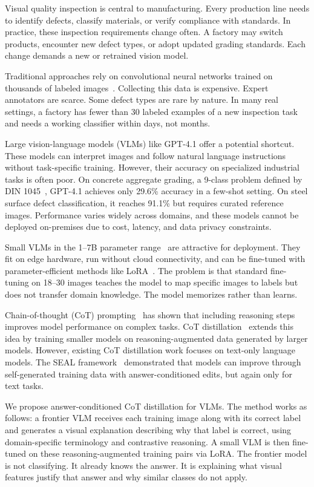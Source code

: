 \documentclass{bmvc2k}
\begin{document}
Visual quality inspection is central to manufacturing. Every production line needs to identify defects, classify materials, or verify compliance with standards. In practice, these inspection requirements change often. A factory may switch products, encounter new defect types, or adopt updated grading standards. Each change demands a new or retrained vision model.

Traditional approaches rely on convolutional neural networks trained on thousands of labeled images~\cite{czimmermann2020visual}. Collecting this data is expensive. Expert annotators are scarce. Some defect types are rare by nature. In many real settings, a factory has fewer than 30 labeled examples of a new inspection task and needs a working classifier within days, not months.

Large vision-language models (VLMs) like GPT-4.1 offer a potential shortcut. These models can interpret images and follow natural language instructions without task-specific training. However, their accuracy on specialized industrial tasks is often poor. On concrete aggregate grading, a 9-class problem defined by DIN 1045~\cite{din1045}, GPT-4.1 achieves only 29.6\% accuracy in a few-shot setting. On steel surface defect classification, it reaches 91.1\% but requires curated reference images. Performance varies widely across domains, and these models cannot be deployed on-premises due to cost, latency, and data privacy constraints.

Small VLMs in the 1--7B parameter range~\cite{wang2024qwen2vl} are attractive for deployment. They fit on edge hardware, run without cloud connectivity, and can be fine-tuned with parameter-efficient methods like LoRA~\cite{hu2021lora}. The problem is that standard fine-tuning on 18--30 images teaches the model to map specific images to labels but does not transfer domain knowledge. The model memorizes rather than learns.

Chain-of-thought (CoT) prompting~\cite{wei2022chain} has shown that including reasoning steps improves model performance on complex tasks. CoT distillation~\cite{hsieh2023distilling} extends this idea by training smaller models on reasoning-augmented data generated by larger models. However, existing CoT distillation work focuses on text-only language models. The SEAL framework~\cite{zweiger2025seal} demonstrated that models can improve through self-generated training data with answer-conditioned edits, but again only for text tasks.

We propose answer-conditioned CoT distillation for VLMs. The method works as follows: a frontier VLM receives each training image along with its correct label and generates a visual explanation describing why that label is correct, using domain-specific terminology and contrastive reasoning. A small VLM is then fine-tuned on these reasoning-augmented training pairs via LoRA. The frontier model is not classifying. It already knows the answer. It is explaining what visual features justify that answer and why similar classes do not apply.
\end{document}
